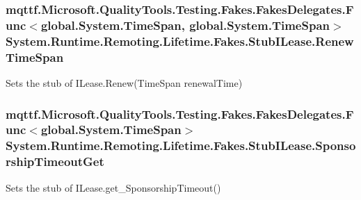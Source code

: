 \hypertarget{class_system_1_1_runtime_1_1_remoting_1_1_lifetime_1_1_fakes_1_1_stub_i_lease_aef76fa56ca245bacb750c5b95136bfd8}{
\subsubsection[{Renew\-Time\-Span}]{\setlength{\rightskip}{0pt plus 5cm}mqttf.\-Microsoft.\-Quality\-Tools.\-Testing.\-Fakes.\-Fakes\-Delegates.\-Func$<$global.\-System.\-Time\-Span, global.\-System.\-Time\-Span$>$ System.\-Runtime.\-Remoting.\-Lifetime.\-Fakes.\-Stub\-I\-Lease.\-Renew\-Time\-Span}}\label{class_system_1_1_runtime_1_1_remoting_1_1_lifetime_1_1_fakes_1_1_stub_i_lease_aef76fa56ca245bacb750c5b95136bfd8}


Sets the stub of I\-Lease.\-Renew(\-Time\-Span renewal\-Time)

\hypertarget{class_system_1_1_runtime_1_1_remoting_1_1_lifetime_1_1_fakes_1_1_stub_i_lease_a7a71f28a3aa93f67c5efa074a60c2c28}{
\subsubsection[{Sponsorship\-Timeout\-Get}]{\setlength{\rightskip}{0pt plus 5cm}mqttf.\-Microsoft.\-Quality\-Tools.\-Testing.\-Fakes.\-Fakes\-Delegates.\-Func$<$global.\-System.\-Time\-Span$>$ System.\-Runtime.\-Remoting.\-Lifetime.\-Fakes.\-Stub\-I\-Lease.\-Sponsorship\-Timeout\-Get}}\label{class_system_1_1_runtime_1_1_remoting_1_1_lifetime_1_1_fakes_1_1_stub_i_lease_a7a71f28a3aa93f67c5efa074a60c2c28}


Sets the stub of I\-Lease.\-get\-\_\-\-Sponsorship\-Timeout()

